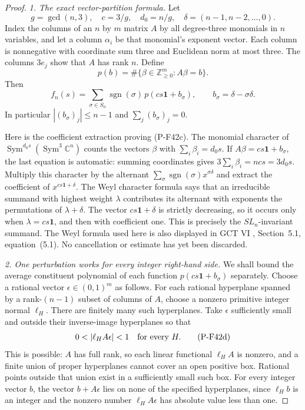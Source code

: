 \begin{proof}
\emph{1. The exact vector-partition formula.}
Let
\[
 g=\gcd(n,3),\quad c=3/g,\quad d_0=n/g,\quad
 \delta=(n-1,n-2,\ldots,0).
\]
Index the columns of an $n$ by $m$ matrix $A$ by all degree-three
monomials in $n$ variables, and let a column $\alpha_i$ be that
monomial's exponent vector. Each column is nonnegative with
coordinate sum three and Euclidean norm at most three.
The columns $3e_j$ show that $A$ has rank $n$. Define
\[
 p(b)=\#\{\beta\in\mathbb Z_{\ge0}^{m}:A\beta=b\}.
\]
Then
\[
 f_n(s)=
 \sum_{\sigma\in S_n}\operatorname{sgn}(\sigma)\,
       p(cs\mathbf1+b_\sigma),\qquad
 b_\sigma=\delta-\sigma\delta.
 \tag{P-F42c}
\]
In particular $|(b_\sigma)_j|\le n-1$ and
$\sum_j(b_\sigma)_j=0$.

Here is the coefficient extraction proving (P-F42c).
The monomial character of
$\operatorname{Sym}^{d_0s}(\operatorname{Sym}^3\mathbb C^n)$
counts the vectors $\beta$ with $\sum_i\beta_i=d_0s$.
If $A\beta=cs\mathbf1+b_\sigma$, the last equation is automatic:
summing coordinates gives $3\sum_i\beta_i=ncs=3d_0s$.
Multiply this character by the alternant
$\sum_{\sigma}\operatorname{sgn}(\sigma)x^{\sigma\delta}$
and extract the coefficient of $x^{cs\mathbf1+\delta}$.
The Weyl character formula says that an irreducible summand with
highest weight $\lambda$ contributes its alternant with exponents
the permutations of $\lambda+\delta$.
The vector $cs\mathbf1+\delta$ is strictly decreasing, so it occurs
only when $\lambda=cs\mathbf1$, and then with coefficient one.
This is precisely the $SL_n$-invariant summand.
The Weyl formula used here is also displayed in GCT VI \cite{PGCTVI},
Section~5.1, equation~(5.1). No cancellation or estimate has yet
been discarded.

\emph{2. One perturbation works for every integer right-hand side.}
We shall bound the average constituent polynomial of each function
$p(cs\mathbf1+b_\sigma)$ separately. Choose a rational vector
$\epsilon\in(0,1)^m$ as follows.
For each rational hyperplane spanned by a rank-$(n-1)$ subset
of columns of $A$, choose a nonzero primitive integer normal
$\ell_H$. There are finitely many such hyperplanes. Take
$\epsilon$ sufficiently small and outside their inverse-image
hyperplanes so that
\[
             0<|\ell_H A\epsilon|<1
                    \quad\hbox{for every }H.
 \tag{P-F42d}
\]
This is possible: $A$ has full rank, so each linear functional
$\ell_H A$ is nonzero, and a finite union of proper hyperplanes
cannot cover an open positive box. Rational points outside that
union exist in a sufficiently small such box.
For every integer vector $b$, the vector $b+A\epsilon$ lies on
none of the specified hyperplanes, since $\ell_H b$ is an integer
and the nonzero number $\ell_H A\epsilon$ has absolute value less
than one.


\end{proof}
